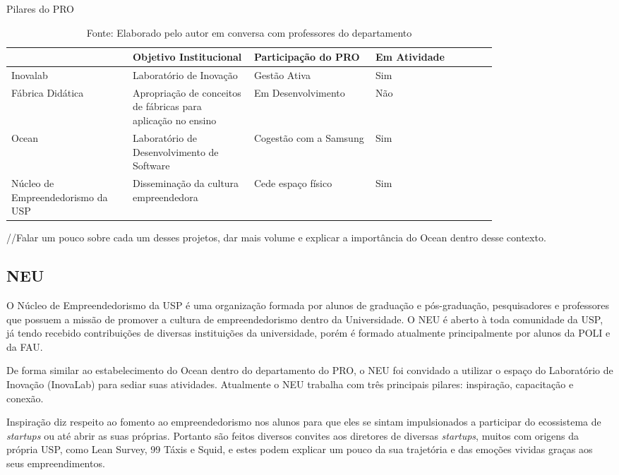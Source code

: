 \begin{table}[H]
\begin{center}
\caption{Pilares do PRO}
\label{tab:pilares_pro}
{\def\arraystretch{2}\tabcolsep=10pt
\begin{tabular}{>{\raggedright}p{0.2\linewidth}>{\raggedright\arraybackslash}p{0.2\linewidth}>{\raggedright\arraybackslash}p{0.2\linewidth}>{\raggedright\arraybackslash}p{0.2\linewidth}}
\hline
     & Objetivo Institucional & Participação do PRO & Em Atividade  \\ \hline
     Inovalab & Laboratório de Inovação & Gestão Ativa & Sim  \\
     Fábrica Didática & Apropriação de conceitos de fábricas para aplicação no ensino & Em Desenvolvimento & Não \\
     Ocean & Laboratório de Desenvolvimento de Software & Cogestão com a Samsung & Sim \\
	 Núcleo de Empreendedorismo da USP & Disseminação da cultura empreendedora & Cede espaço físico & Sim \\ \hline
\end{tabular}%
}
\caption* {Fonte: Elaborado pelo autor em conversa com professores do departamento}
\end{center}
\end{table}

//Falar um pouco sobre cada um desses projetos, dar mais volume e explicar a importância do Ocean dentro desse contexto. 

\subsection{NEU}
\label{sec:con_neu}

O Núcleo de Empreendedorismo da USP é uma organização formada por alunos de graduação e pós-graduação, pesquisadores e professores que possuem a missão de promover a cultura de empreendedorismo dentro da Universidade. O NEU é aberto à toda comunidade da USP, já tendo recebido contribuições de diversas instituições da universidade, porém é formado atualmente principalmente por alunos da POLI e da FAU.

De forma similar ao estabelecimento do Ocean dentro do departamento do PRO, o NEU foi convidado a utilizar o espaço do Laboratório de Inovação (InovaLab) para sediar suas atividades. Atualmente o NEU trabalha com três principais pilares: inspiração, capacitação e conexão.

Inspiração diz respeito ao fomento ao empreendedorismo nos alunos para que eles se sintam impulsionados a participar do ecossistema de \textit{startups} ou até abrir as suas próprias. Portanto são feitos diversos convites aos diretores de diversas \textit{startups}, muitos com origens da própria USP, como Lean Survey, 99 Táxis e Squid, e estes podem explicar um pouco da sua trajetória e das emoções vividas graças aos seus empreendimentos. 

